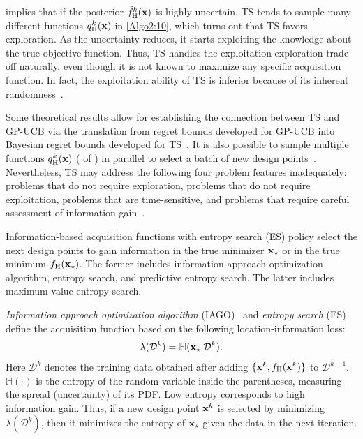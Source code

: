 \documentclass[iicol,sn-basic]{sn-jnl}%
\begin{document}
 implies that if the posterior $\hat{f}_\text{H}^k({\bf x})$ is highly uncertain, TS tends to sample many different functions $q_\text{H}^k({\bf x})$ in \cref{Algo2:10}, which turns out that TS favors exploration.
As the uncertainty reduces, it starts exploiting the knowledge about the true objective function.
Thus, TS handles the exploitation-exploration trade-off naturally, even though it is not known to maximize any specific acquisition function. 
In fact, the exploitation ability of TS is inferior because of its inherent randomness~\citep{Scott2010}.

Some theoretical results allow for establishing the connection between TS and GP-UCB via the translation from regret bounds developed for GP-UCB into Bayesian regret bounds developed for TS~\citep{Russo2014}.
It is also possible to sample multiple functions $q_\text{H}^k({\bf x})$ ( of ) in parallel to select a batch of new design points~\citep{Kandasamy2018}.
Nevertheless, TS may address the following four problem features inadequately: problems that do not require exploration, problems that do not require exploitation, problems that are time-sensitive, and problems that require careful assessment of information gain~\citep{Russo2018}.

Information-based acquisition functions with entropy search (ES) policy select the next design points to gain information in the true minimizer ${\bf x}_\star$ or in the true minimum $f_\text{H}({\bf x}_\star)$.
The former includes information approach optimization algorithm, entropy search, and predictive entropy search.
The latter includes maximum-value entropy search.

\textit{Information approach optimization algorithm} (IAGO)~\citep{Villemonteix2009} and \textit{entropy search} (ES)~\citep{Hennig2012} define the acquisition function based on the following location-information loss:
\begin{equation}\label{Eq46}
	\lambda(\mathcal{D}^{k}) = \mathbb{H}({\bf x}_\star|\mathcal{D}^{k}).
\end{equation}
Here $\mathcal{D}^{k}$ denotes the training data obtained after adding $\{{\bf x}^k,f_\text{H}({\bf x}^k)\}$ to $\mathcal{D}^{k-1}$.
$\mathbb{H}(\cdot)$ is the entropy of the random variable inside the parentheses, measuring the spread (uncertainty) of its PDF.
Low entropy corresponds to high information gain.
Thus, if a new design point ${\bf x}^k$ is selected by minimizing $\lambda(\mathcal{D}^{k})$, then it minimizes the entropy of ${\bf x}_\star$ given the data in the next iteration. 
\end{document}
